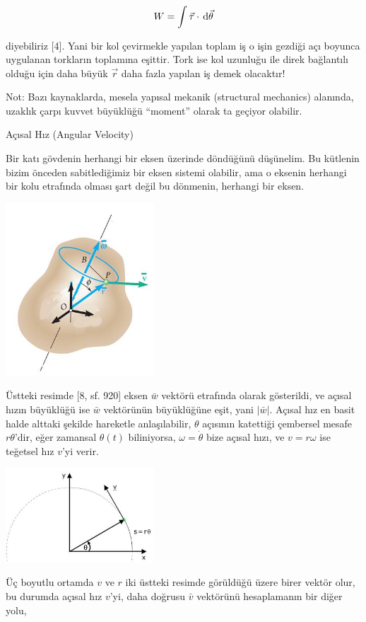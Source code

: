 \documentclass[12pt,fleqn]{article}\usepackage{../../common}
\begin{document}
$$
W = \int  \vec{\tau} \cdot \,\mathrm{d} \vec{\theta}
$$

diyebiliriz [4]. Yani bir kol çevirmekle yapılan toplam iş o işin gezdiği
açı boyunca uygulanan torkların toplamına eşittir. Tork ise kol uzunluğu
ile direk bağlantılı olduğu için daha büyük $\vec{r}$ daha fazla yapılan
iş demek olacaktır!

Not: Bazı kaynaklarda, mesela yapısal mekanik (structural mechanics) alanında,
uzaklık çarpı kuvvet büyüklüğü ``moment'' olarak ta geçiyor olabilir.

Açısal Hız (Angular Velocity)

Bir katı gövdenin herhangi bir eksen üzerinde döndüğünü düşünelim.  Bu kütlenin
bizim önceden sabitlediğimiz bir eksen sistemi olabilir, ama o eksenin herhangi
bir kolu etrafında olması şart değil bu dönmenin, herhangi bir eksen.

\includegraphics[width=15em]{phy_005_basics_02_14.jpg}

Üstteki resimde [8, sf. 920] eksen $\bar{w}$ vektörü etrafında olarak
gösterildi, ve açısal hızın büyüklüğü ise $\bar{w}$ vektörünün büyüklüğüne eşit,
yani $|\bar{w}|$.  Açısal hız en basit halde alttaki şekilde hareketle
anlaşılabilir, $\theta$ açısının katettiği çembersel mesafe $r\theta$'dir, eğer
zamansal $\theta(t)$ biliniyorsa, $\omega = \dot{\theta}$ bize açısal hızı, ve
$v = r\omega$ ise teğetsel hız $v$'yi verir.

\includegraphics[width=15em]{phy_005_basics_02_15.jpg}

Üç boyutlu ortamda $v$ ve $r$ iki üstteki resimde görüldüğü üzere birer vektör
olur, bu durumda açısal hız $v$'yi, daha doğrusu $\bar{v}$ vektörünü
hesaplamanın bir diğer yolu,
\end{document}
